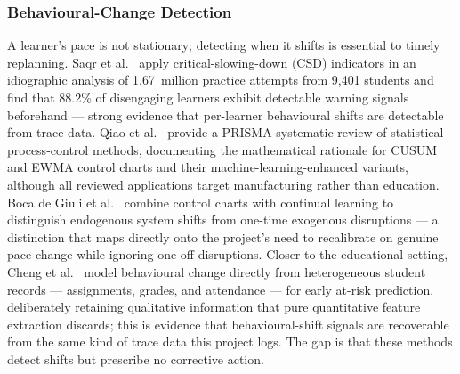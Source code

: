 \documentclass[12pt]{report}
\begin{document}
\subsubsection{Behavioural-Change Detection}
A learner's pace is not stationary; detecting when it shifts is essential to timely
replanning. Saqr et al.~\cite{saqr2026} apply critical-slowing-down (CSD) indicators in an
idiographic analysis of 1.67~million practice attempts from 9{,}401 students and find that
88.2\% of disengaging learners exhibit detectable warning signals beforehand --- strong
evidence that per-learner behavioural shifts are detectable from trace data. Qiao et
al.~\cite{qiao2026} provide a PRISMA systematic review of statistical-process-control
methods, documenting the mathematical rationale for CUSUM and EWMA control charts and
their machine-learning-enhanced variants, although all reviewed applications target
manufacturing rather than education. Boca de Giuli et al.~\cite{boca2024} combine control
charts with continual learning to distinguish endogenous system shifts from one-time
exogenous disruptions --- a distinction that maps directly onto the project's need to
recalibrate on genuine pace change while ignoring one-off disruptions. Closer to the
educational setting, Cheng et al.~\cite{cheng2024} model behavioural change directly from
heterogeneous student records --- assignments, grades, and attendance --- for early
at-risk prediction, deliberately retaining qualitative information that pure quantitative
feature extraction discards; this is evidence that behavioural-shift signals are
recoverable from the same kind of trace data this project logs. The gap is that these
methods detect shifts but prescribe no corrective action.
\end{document}

